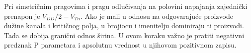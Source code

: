 Pri simetričnim pragovima i pragu odlučivanja na polovini napajanja zajednički prenapon je $V_{DD}/2-V_{Tn}$. Ako je mali u odnosu na odgovarajuće proizvode dužine kanala i kritičnog polja, u brojiocu i imenitelju dominiraju ti proizvodi. Tada se dobija granični odnos širina. U ovom koraku važno je pratiti negativni predznak P parametara i apsolutnu vrednost u njihovom pozitivnom zapisu.
